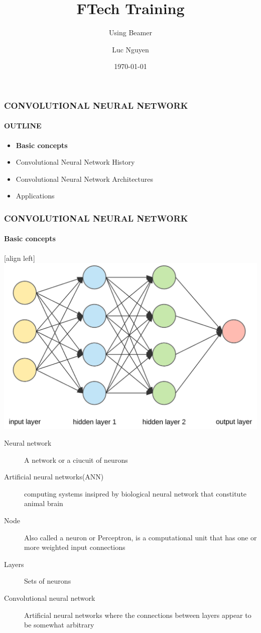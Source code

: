 \documentclass[11pt]{beamer}
\title{FTech Training}
\subtitle{Using Beamer}
\author{Luc Nguyen}
\institute{HUST}
\date{\today}
\begin{document}
	\begin{frame}
		\frametitle{\textbf{CONVOLUTIONAL NEURAL NETWORK}}
		\framesubtitle{OUTLINE}
		\begin{itemize}
			\item \textbf{Basic concepts}
			\item Convolutional Neural Network History
			\item Convolutional Neural Network Architectures
			\item Applications  
		\end{itemize}
	\end{frame}
	\begin{frame}
		\frametitle{\textbf{CONVOLUTIONAL NEURAL NETWORK}}
		\framesubtitle{Basic concepts}
		[align left]
		\centering\includegraphics[scale=0.1]{CNN_Visualize.png}
		\begin{description}
			\item[Neural network]A network or a ciucuit of neurons
			\item[Artificial neural networks(ANN)]computing systems insipred by biological neural network that constitute animal brain
			\item[Node] Also called a neuron or Perceptron, is a computational unit that has one or more weighted input connections
			\item[Layers] Sets of neurons
			\item[Convolutional neural network] Artificial neural networks where the connections between layers appear to be somewhat arbitrary
		\end{description}
	\end{frame}
\end{document}
